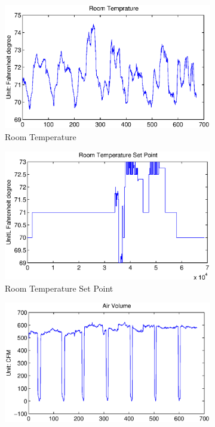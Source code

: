 \begin{figure}[ht!]
\begin{subfigure}{0.32\textwidth}
  \end{subfigure}
  \begin{subfigure}{0.32\textwidth}
                \centering
    \includegraphics[width=\textwidth]{./fig/rmt.eps}
                \caption{Room Temperature}
  \end{subfigure}
  \begin{subfigure}{0.32\textwidth}
                \centering
    \includegraphics[width=\textwidth]{./fig/stpt.eps}
                \caption{Room Temperature Set Point}
  \end{subfigure}
  \begin{subfigure}{0.32\textwidth}
                \centering
    \includegraphics[width=\textwidth]{./fig/vav.eps}

\end{subfigure}
\end{figure}
